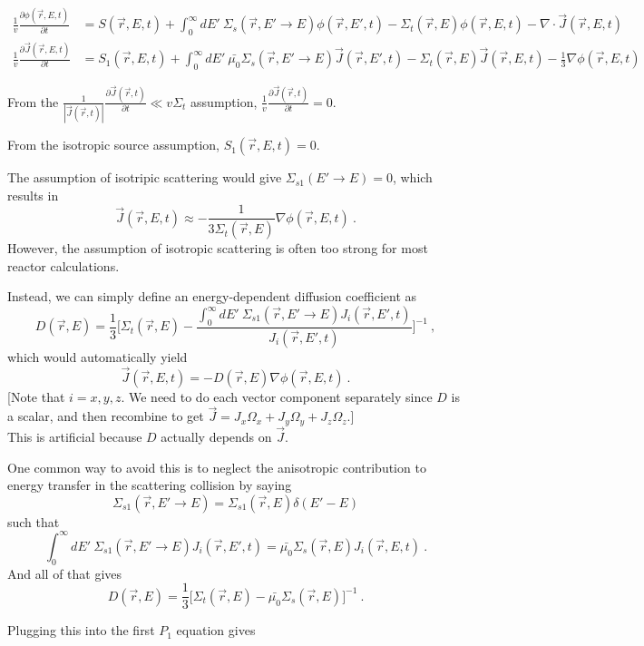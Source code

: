 \documentclass[12pt]{article}
\newcommand{\rvec}{\ensuremath{\vec{r}}}
\begin{document}
\begin{align*}
\frac{1}{v}\frac{\partial\phi(\rvec,E,t)}{\partial t} &= S(\rvec,E,t) + 
\int^{\infty}_0dE'\:\Sigma_s(\rvec, E'\rightarrow E)\phi(\rvec,E',t) - 
\Sigma_t(\rvec,E)\phi(\rvec,E,t) - \nabla\cdot\vec{J}(\rvec,E,t)\\
%
\frac{1}{v}\frac{\partial \vec{J}(\rvec,E,t)}{\partial t} &= S_1(\rvec,E,t) + 
\int^{\infty}_0dE'\:\bar{\mu_0}\Sigma_s(\rvec,E'\rightarrow E)\vec{J}(\rvec,E',t) - 
\Sigma_t(\rvec,E)\vec{J}(\rvec,E,t) - \frac{1}{3}\nabla\phi(\rvec,E,t)
\end{align*}

From the $\frac{1}{|\vec{J}(\rvec,t)|}\frac{\partial\vec{J}(\rvec,t)}{\partial t}\ll v\Sigma_t$ 
assumption, $\frac{1}{v}\frac{\partial\vec{J}(\rvec,t)}{\partial t} = 0$.

From the isotropic source assumption, $S_1(\rvec,E,t) = 0$.

The assumption of isotripic scattering would give $\Sigma_{s1}(E' \rightarrow E)=0$, which results in
\[\vec{J}(\vec{r}, E, t) \approx - \frac{1}{3 \Sigma_t(\vec{r}, E)}\nabla \phi(\vec{r}, E, t)\:. \]
However, the assumption of isotropic scattering is often too strong for most reactor calculations.

Instead, we can simply define an energy-dependent diffusion coefficient as
\[D(\vec{r}, E) = \frac{1}{3} \biggl[ \Sigma_t(\vec{r}, E) - \frac{\int_0^{\infty} dE' \: \Sigma_{s1}(\vec{r},E' \rightarrow E)J_i(\vec{r}, E', t)}{J_i(\vec{r}, E', t)}\biggr]^{-1}\:,\]
which would automatically yield
\[\vec{J}(\vec{r}, E, t) = -D(\vec{r},E)\nabla \phi(\vec{r}, E, t)\:.\]
[Note that $i = x,y,z$. We need to do each vector component separately since $D$ is a scalar, and then recombine to get $\vec{J} = J_x \Omega_x + J_y \Omega_y + J_z \Omega_z$.]\\
This is artificial because $D$ actually depends on $\vec{J}$.

One common way to avoid this is to neglect the anisotropic contribution to energy transfer in the scattering collision by saying
\[\Sigma_{s1}(\vec{r},E' \rightarrow E) = \Sigma_{s1}(\vec{r},E) \delta(E' - E)\]
such that
\[\int_0^{\infty} dE' \: \Sigma_{s1}(\vec{r},E' \rightarrow E)J_i(\vec{r}, E', t) = \bar{\mu_0} \Sigma_s(\vec{r},E) J_i(\vec{r}, E, t)\:.\]
And all of that gives
\[D(\vec{r}, E) = \frac{1}{3} \bigl[\Sigma_t(\vec{r}, E) - \bar{\mu_0} \Sigma_s(\vec{r}, E) \bigr]^{-1}\:.\]

Plugging this into the first $P_1$ equation gives
\end{document}
